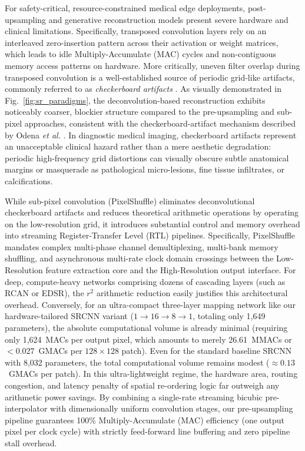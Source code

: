\documentclass[conference]{IEEEtran}
\begin{document}
For safety-critical, resource-constrained medical edge deployments, post-upsampling and generative reconstruction models present severe hardware and clinical limitations. Specifically, transposed convolution layers rely on an interleaved zero-insertion pattern across their activation or weight matrices, which leads to idle Multiply-Accumulate (MAC) cycles and non-contiguous memory access patterns on hardware. More critically, uneven filter overlap during transposed convolution is a well-established source of periodic grid-like artifacts, commonly referred to as \textit{checkerboard artifacts} \cite{odena2016deconvolution}. As visually demonstrated in Fig.~\ref{fig:sr_paradigms}, the deconvolution-based reconstruction exhibits noticeably coarser, blockier structure compared to the pre-upsampling and sub-pixel approaches, consistent with the checkerboard-artifact mechanism described by Odena \textit{et al.} \cite{odena2016deconvolution}. In diagnostic medical imaging, checkerboard artifacts represent an unacceptable clinical hazard rather than a mere aesthetic degradation: periodic high-frequency grid distortions can visually obscure subtle anatomical margins or masquerade as pathological micro-lesions, fine tissue infiltrates, or calcifications. 

While sub-pixel convolution (PixelShuffle) eliminates deconvolutional checkerboard artifacts and reduces theoretical arithmetic operations by operating on the low-resolution grid, it introduces substantial control and memory overhead into streaming Register-Transfer Level (RTL) pipelines. Specifically, PixelShuffle mandates complex multi-phase channel demultiplexing, multi-bank memory shuffling, and asynchronous multi-rate clock domain crossings between the Low-Resolution feature extraction core and the High-Resolution output interface. For deep, compute-heavy networks comprising dozens of cascading layers (such as RCAN or EDSR), the $r^2$ arithmetic reduction easily justifies this architectural overhead. Conversely, for an ultra-compact three-layer mapping network like our hardware-tailored SRCNN variant ($1 \rightarrow 16 \rightarrow 8 \rightarrow 1$, totaling only 1,649 parameters), the absolute computational volume is already minimal (requiring only 1,624~MACs per output pixel, which amounts to merely 26.61~MMACs or $<0.027$~GMACs per $128 \times 128$ patch). Even for the standard baseline SRCNN \cite{dong2014learning} with 8,032 parameters, the total computational volume remains modest ($\approx 0.13$~GMACs per patch). In this ultra-lightweight regime, the hardware area, routing congestion, and latency penalty of spatial re-ordering logic far outweigh any arithmetic power savings. By combining a single-rate streaming bicubic pre-interpolator with dimensionally uniform convolution stages, our pre-upsampling pipeline guarantees 100\% Multiply-Accumulate (MAC) efficiency (one output pixel per clock cycle) with strictly feed-forward line buffering and zero pipeline stall overhead.
\end{document}
